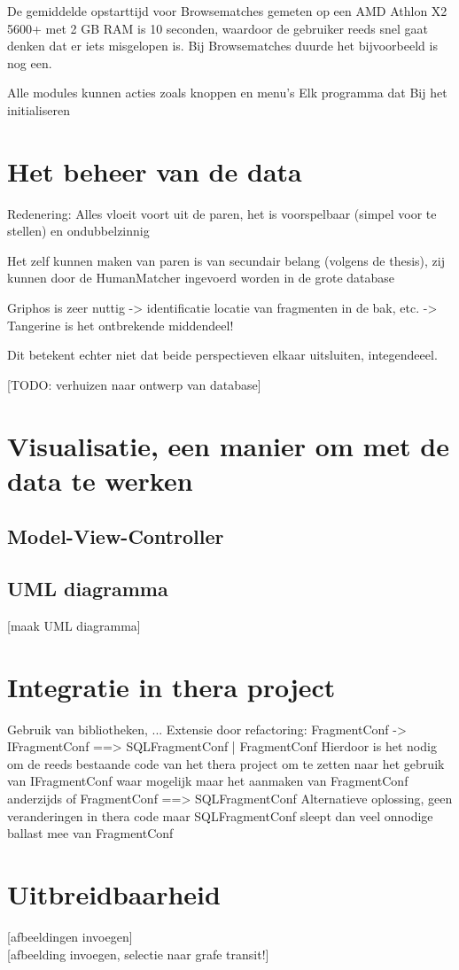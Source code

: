 De gemiddelde opstarttijd voor Browsematches gemeten op een AMD Athlon X2 5600+ met 2 GB RAM is 10 seconden, waardoor de gebruiker reeds snel gaat denken dat er iets misgelopen is. Bij Browsematches duurde het bijvoorbeeld  is nog  een. 

Alle modules kunnen acties zoals knoppen en menu's  Elk programma dat Bij het initialiseren 

\section{Het beheer van de data}

Redenering: Alles vloeit voort uit de paren, het is voorspelbaar (simpel voor te stellen) en ondubbelzinnig

Het zelf kunnen maken van paren is van secundair belang (volgens de thesis), zij kunnen door de HumanMatcher ingevoerd worden in de grote database

Griphos is zeer nuttig -> identificatie locatie van fragmenten in de bak, etc. -> Tangerine is het ontbrekende middendeel!

Dit betekent echter niet dat beide perspectieven elkaar uitsluiten, integendeeel.
 
[TODO: verhuizen naar ontwerp van database]

\section{Visualisatie, een manier om met de data te werken}

\subsection{Model-View-Controller}

\subsection{UML diagramma}

[maak UML diagramma]\\

\section{Integratie in thera project}
Gebruik van bibliotheken, ...
Extensie door refactoring: FragmentConf -> IFragmentConf ==> SQLFragmentConf | FragmentConf
Hierdoor is het nodig om de reeds bestaande code van het thera project om te zetten naar het gebruik van IFragmentConf waar mogelijk maar het aanmaken van FragmentConf anderzijds
of FragmentConf ==> SQLFragmentConf
Alternatieve oplossing, geen veranderingen in thera code maar SQLFragmentConf sleept dan veel onnodige ballast mee van FragmentConf

\section{Uitbreidbaarheid}
[afbeeldingen invoegen]\\


[afbeelding invoegen, selectie naar grafe transit!]\\
